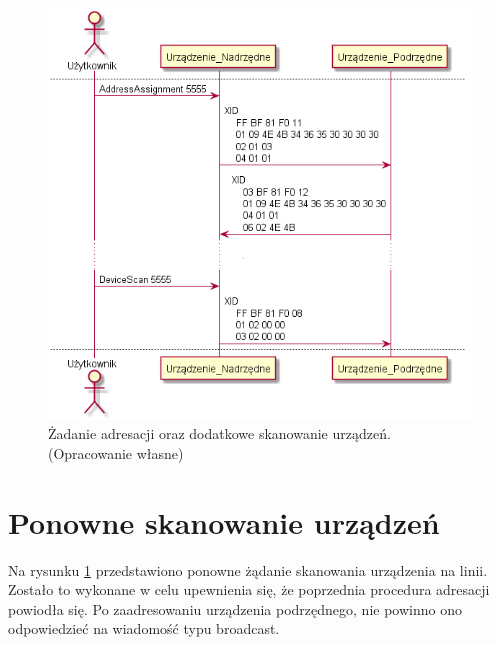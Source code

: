 \begin{figure}[h!]
    \centering
    \includegraphics[scale=0.75]{out/Diagramy/UML_DiagramOfSequence_New/UML_DiagramOfSequence_New-page2.png}
    \caption{Żadanie adresacji oraz dodatkowe skanowanie urządzeń.
        \newline(Opracowanie własne)}
    \label{fig:DiagramSequence_AddressAssignment_SecondDeviceScan}
\end{figure}


\section{Ponowne skanowanie urządzeń}
Na rysunku \ref{fig:DiagramSequence_AddressAssignment_SecondDeviceScan} przedstawiono ponowne żądanie skanowania urządzenia na linii.
Zostało to wykonane w celu upewnienia się, że poprzednia procedura adresacji powiodła się. Po zaadresowaniu urządzenia podrzędnego, nie powinno
ono odpowiedzieć na wiadomość typu broadcast.


